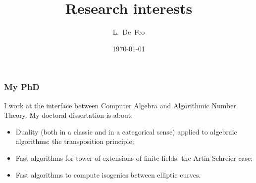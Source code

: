 \documentclass[10pt]{beamer}
\title{Research interests}
\author[L.~De~Feo]{L.~De~Feo}
\institute[TANC, LIX]{INRIA Projet TANC \& LIX, École Polytechnique}
\date{\today}
\newcommand{\0}{\mathcal{O}}  %
\begin{document}
\begin{frame}
  \titlepage
\end{frame}


\begin{frame}
  \frametitle{My PhD}
  
  I work at the interface between Computer Algebra and Algorithmic
  Number Theory. My doctoral dissertation is about:
  \begin{itemize}
  \item Duality (both in a classic and in a categorical sense) applied
    to algebraic algorithms: the transposition principle;
  \item Fast algorithms for tower of extensions of finite fields: the
    Artin-Schreier case;
  \item Fast algorithms to compute isogenies between elliptic curves.
  \end{itemize}
\end{frame}

\end{document}
